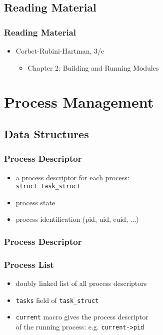 \documentclass[dvipsnames]{beamer}
\begin{document}
\subsection*{Reading Material}

\begin{frame}
  \frametitle{Reading Material}

  \begin{itemize}
    \item Corbet-Rubini-Hartman, 3/e
    \begin{itemize}
      \item Chapter 2: \alert{Building and Running Modules}
    \end{itemize}
  \end{itemize}
\end{frame}

\section{Process Management}

\subsection{Data Structures}

\begin{frame}
  \frametitle{Process Descriptor}

  \begin{itemize}
    \item a process descriptor for each process:\\
      \lstinline{struct task_struct}

    \medskip
    \item process state
    \item process identification (pid, uid, euid, ...)
   \end{itemize}
\end{frame}

\begin{frame}
  \frametitle{Process Descriptor}

  \begin{center}
  \end{center}
\end{frame}

\begin{frame}
  \frametitle{Process List}

  \begin{itemize}
    \item doubly linked list of all process descriptors
    \item \lstinline|tasks| field of \lstinline|task_struct|
    \item \lstinline|current| macro gives the process descriptor\\
      of the running process: e.g. \lstinline|current->pid|
  \end{itemize}
\end{frame}
\end{document}

